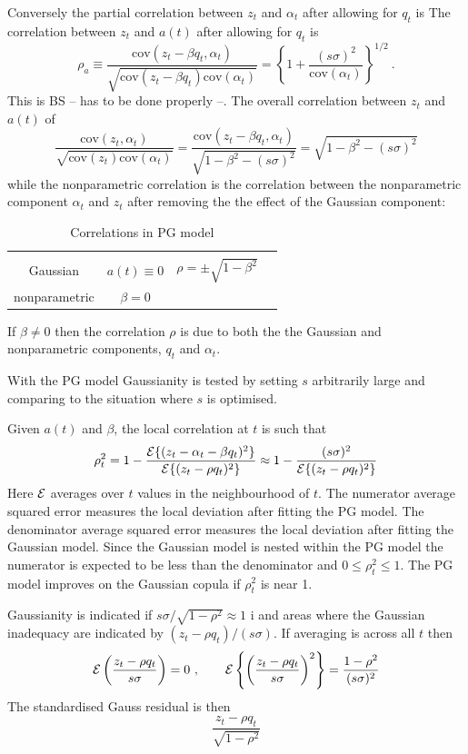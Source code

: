 \documentclass[authoryear]{elsarticle}
\newcommand{\cov}{\mathrm{cov}}
\newcommand{\Ex}{{\cal E}}
\newcommand{\cq}{\ , \qquad}
\newcommand{\be}[1]{\begin{equation}\label{#1}}
\newcommand{\ee}{\end{equation}}
\begin{document}
Conversely the partial correlation between $z_t$ and $\alpha_t$ after allowing for $q_t$ is The  correlation between $z_t$ and $a(t)$ after allowing for $q_t$ is
\be{rho2}
\rho_a\equiv\frac{\cov(z_t-\beta q_t,\alpha_t)}{\sqrt{\cov(z_t-\beta q_t)\cov(\alpha_t)}} = \left\{1+\frac{(s\sigma)^2}{\cov(\alpha_t)}\right\}^{1/2}\ .
\ee
This is BS -- has to be done properly --.  The  overall correlation between $z_t$ and $a(t)$ of
$$
\frac{\cov(z_t,\alpha_t)}{\sqrt{\cov(z_t)\cov(\alpha_t)}} = \frac{\cov(z_t-\beta q_t,\alpha_t)}{\sqrt{1-\beta^2-(s\sigma)^2}} =\sqrt{1-\beta^2-(s\sigma)^2}
$$
while the nonparametric correlation is the correlation between the nonparametric component $\alpha_t$ and  $z_t$ after removing the the effect of the Gaussian component:

\begin{table}[htdp]
\caption{Correlations in PG model}\label{default}
\begin{center}
\begin{tabular}{c|ccc}
&&\\
Gaussian& $a(t)\equiv 0$& $\rho=\pm\sqrt{1-\beta^2}$\\
nonparametric & $\beta=0$\\
\end{tabular}
\end{center}
\end{table}%
 

   If $\beta\ne 0$ then the correlation $\rho$ is due to both the the Gaussian and nonparametric components,  $q_t$ and $\alpha_t$.

With the PG model  Gaussianity is tested by setting $s$ arbitrarily large and comparing to the situation where $s$ is optimised.

Given $a(t)$ and $\beta$, the local  correlation at $t$ is such that
\be{rhot2}
\rho_t^2=1-\frac{\Ex\{(z_t-\alpha_t-\beta q_t)^2\}}{\Ex\{(z_t-\rho q_t)^2\}} \approx 1-\frac{(s\sigma)^2}{\Ex\{(z_t-\rho q_t)^2\}}
\ee
Here $\Ex$ averages over $t$ values in the neighbourhood of $t$.  The numerator average squared error measures the local deviation after fitting the PG model.  The denominator average squared error measures the local deviation after fitting the Gaussian model.   Since the Gaussian model is nested within the PG model the numerator is expected to be less than the denominator and $0\le\rho_t^2\le1$.   The PG model improves on the Gaussian copula if $\rho_t^2$ is near 1.

Gaussianity is indicated if $s\sigma/\sqrt{1-\rho^2}\approx 1$ i and areas where the Gaussian inadequacy are indicated by $(z_t-\rho q_t)/(s\sigma)$.  If averaging is across all $t$ then
$$
\Ex\left(\frac{z_t-\rho q_t}{s\sigma}\right) = 0\cq \Ex\left\{\left(\frac{z_t-\rho q_t}{s\sigma}\right)^2\right\} = \frac{1-\rho^2}{(s\sigma)^2}
$$
The standardised Gauss residual is then
$$
\frac{z_t-\rho q_t}{\sqrt{1-\rho^2}}
$$
\end{document}
